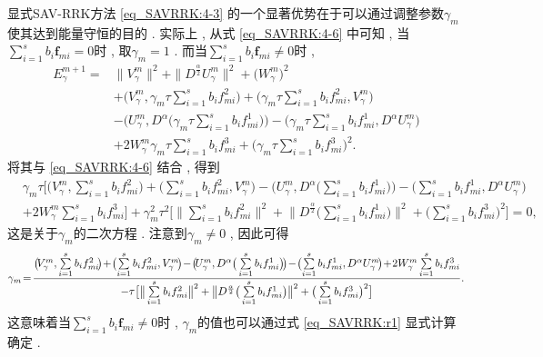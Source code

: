 显式SAV-RRK方法 \eqref{eq_SAVRRK:4-3} 的一个显著优势在于可以通过调整参数$\gamma_m$ 使其达到能量守恒的目的 . 
实际上 , 从式 \eqref{eq_SAVRRK:4-6} 中可知 , 当$\sum\limits_{i=1}^s b_i \bm{f}_{m i}=0$时 , 取$\gamma_m=1$ . 
而当$\sum\limits_{i=1}^s b_i \bm{f}_{m i}\neq 0$时 , 
\begin{align}
E_{\gamma}^{m+1}  = & \|V_{\gamma}^{m}\|^2+\|D^\frac{\alpha}{2} U_{\gamma}^{m}\|^2+\big(W_{\gamma}^{m}\big)^2 \nonumber\\
& + \big(V_{\gamma}^{m} , \gamma_m\tau\sum\limits_{i=1}^{s}b_if_{mi}^2\big)+\big(\gamma_m\tau\sum\limits_{i=1}^{s}b_if_{mi}^2 , V_{\gamma}^{m}\big)\nonumber\\
&-\big(U_{\gamma}^{m} , D^{\alpha}\big(\gamma_m\tau\sum\limits_{i=1}^{s}b_if_{mi}^1\big)\big)-\big(\gamma_m\tau\sum\limits_{i=1}^{s}b_if_{mi}^1 , D^{\alpha} U_{\gamma}^{m}\big)\nonumber\\
&+2W_{\gamma}^{m}\gamma_m\tau\sum\limits_{i=1}^{s}b_if_{mi}^3+\big(\gamma_m\tau\sum\limits_{i=1}^{s}b_if_{mi}^3\big)^2 . \label{eq_SAVRRK:49}
\end{align}
将其与 \eqref{eq_SAVRRK:4-6} 结合 , 得到
\begin{align*}
&\gamma_m\tau\big[\big(V_{\gamma}^{m} , \sum\limits_{i=1}^{s}b_if_{mi}^2\big)+\big(\sum\limits_{i=1}^{s}b_if_{mi}^2 , V_{\gamma}^{m}\big)-\big(U_{\gamma}^{m} , D^{\alpha}\big(\sum\limits_{i=1}^{s}b_if_{mi}^1\big)\big)-\big(\sum\limits_{i=1}^{s}b_if_{mi}^1 , D^{\alpha} U_{\gamma}^{m}\big)\\
&+2W_{\gamma}^{m}\sum\limits_{i=1}^{s}b_if_{mi}^3\big] +\gamma_m^2\tau^2\big[\big\|\sum\limits_{i=1}^{s}b_if_{mi}^2\big\|^2+ \big\|D^\frac{\alpha}{2}\big(\sum\limits_{i=1}^{s}b_if_{mi}^1\big)\big\|^2+\big(\sum\limits_{i=1}^{s}b_if_{mi}^3\big)^2\big]=0 , 
\end{align*}
这是关于$\gamma_m$的二次方程 . 注意到$\gamma_m\neq 0$ , 因此可得
\begin{equation}\label{eq_SAVRRK:r1}\small
\gamma_m \!=\! \frac{\big(\!V_{\gamma}^{m} , \sum\limits_{i=1}^{s}b_if_{mi}^2\!\big)\!+\!\big(\!\sum\limits_{i=1}^{s}b_if_{mi}^2 , V_{\gamma}^{m}\!\big)\!-\!\big(\!U_{\gamma}^{m} , D^{\alpha}\big(\sum\limits_{i=1}^{s}b_if_{mi}^1\big)\!\big)\!-\!\big(\!\sum\limits_{i=1}^{s}b_if_{mi}^1 , D^{\alpha} U_{\gamma}^{m}\!\big)\!+\!2W_{\gamma}^{m}\sum\limits_{i=1}^{s}b_if_{mi}^3}{-\tau\big[\big\|\sum\limits_{i=1}^{s}b_if_{mi}^2\big\|^2+\big\|D^\frac{\alpha}{2}\big(\sum\limits_{i=1}^{s}b_if_{mi}^1\big)\big\|^2+\big(\sum\limits_{i=1}^{s}b_if_{mi}^3\big)^2\big]}  . 
\end{equation}
这意味着当$\sum\limits_{i=1}^s b_i \bm{f}_{m i}\neq 0$时 , $\gamma_m$的值也可以通过式 \eqref{eq_SAVRRK:r1} 显式计算确定 . 

